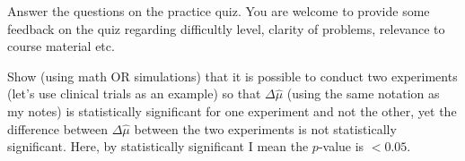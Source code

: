 \begin{exercise}
Answer the questions on the practice quiz. You are welcome to provide some feedback on the quiz regarding difficultly level, clarity of problems, relevance to course material etc. 
\end{exercise}



\begin{exercise}
Show (using math OR simulations) that it is possible to conduct two experiments (let's use clinical trials as an example) so that $\Delta \hat{\mu}$ (using the same notation as my notes) is statistically significant for one experiment and not the other, yet the difference between $\Delta \hat{\mu}$ between the two experiments is not statistically significant.  Here, by statistically significant I mean the $p$-value is $<0.05$. 
\end{exercise}





 
 
